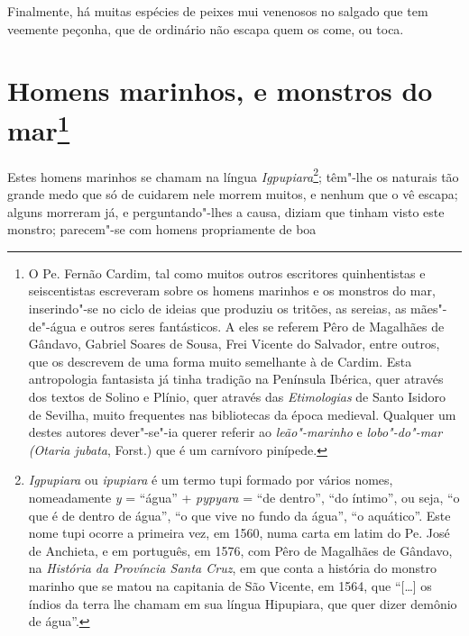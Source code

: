  Finalmente, há muitas espécies de peixes mui venenosos no salgado que
tem veemente peçonha, que de ordinário não escapa quem os come, ou toca.

\section[Homens marinhos, e monstros do mar]{Homens marinhos,
e monstros do mar\protect\footnote[*]{\MakeUppercase{O P}e. \MakeUppercase{F}ernão
\MakeUppercase{C}ardim, tal como muitos outros escritores quinhentistas e seiscentistas
escreveram sobre os homens marinhos e os monstros do mar, inserindo"-se
no ciclo de ideias que produziu os tritões, as sereias, as mães"-de"-água
e outros seres fantásticos. \MakeUppercase{A} eles se referem \MakeUppercase{P}êro de \MakeUppercase{M}agalhães de \MakeUppercase{G}ândavo,
\MakeUppercase{G}abriel \MakeUppercase{S}oares de \MakeUppercase{S}ousa, \MakeUppercase{F}rei \MakeUppercase{V}icente do \MakeUppercase{S}alvador, entre outros, que os
descrevem de uma forma muito semelhante à de \MakeUppercase{C}ardim. \MakeUppercase{E}sta antropologia
fantasista já tinha tradição na \MakeUppercase{P}enínsula \MakeUppercase{I}bérica, quer através dos
textos de \MakeUppercase{S}olino e \MakeUppercase{P}línio, quer através das \textit{\MakeUppercase{E}timologias} de
\MakeUppercase{S}anto \MakeUppercase{I}sidoro de \MakeUppercase{S}evilha, muito frequentes nas bibliotecas da época
medieval. \MakeUppercase{Q}ualquer um destes autores dever"-se"-ia querer referir ao
\textit{leão"-marinho} e \textit{lobo"-do"-mar (\MakeUppercase{O}taria jubata}, \MakeUppercase{F}orst.)
que é um carnívoro pinípede.}}  
Estes homens marinhos se chamam na língua \textit{Igpupiara}\footnote{ \textit{Igpupiara} 
ou \textit{ipupiara} é um termo tupi
formado por vários nomes, nomeadamente \textit{y} = ``água'' +
\textit{pypyara} = ``de dentro'', ``do íntimo'', ou seja, ``o que é de
dentro de água'', ``o que vive no fundo da água'', ``o aquático''. Este
nome tupi ocorre a primeira vez, em 1560, numa carta em latim do Pe.
José de Anchieta, e em português, em 1576, com Pêro de Magalhães de Gândavo,
na \textit{História da Província Santa Cruz}, em que conta a
história do monstro marinho que se matou na capitania de São Vicente,
em 1564, que ``[\ldots{}] os índios da terra lhe chamam em sua língua
Hipupiara, que quer dizer demônio de água''.}; têm"-lhe os naturais tão
grande medo que só de cuidarem nele morrem muitos, e nenhum que o vê
escapa; alguns morreram já, e perguntando"-lhes a causa, diziam que
tinham visto este monstro; parecem"-se com homens propriamente de boa

